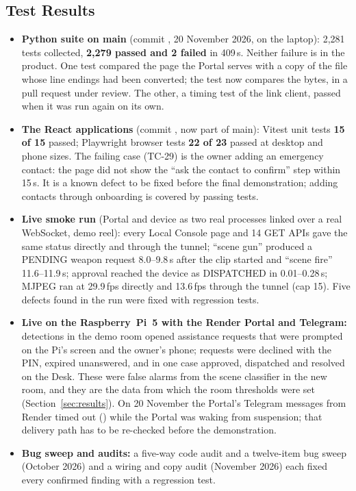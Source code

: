 \subsection{Test Results}
\label{sec:test-results}
\begin{itemize}
\item \textbf{Python suite on main} (commit , 20 November 2026, on the laptop): 2,281 tests collected, \textbf{2,279 passed and 2 failed} in 409\,s. Neither failure is in the product. One test compared the page the Portal serves with a copy of the file whose line endings had been converted; the test now compares the bytes, in a pull request under review. The other, a timing test of the link client, passed when it was run again on its own.
\item \textbf{The React applications} (commit , now part of main): Vitest unit tests \textbf{15 of 15} passed; Playwright browser tests \textbf{22 of 23} passed at desktop and phone sizes. The failing case (TC-29) is the owner adding an emergency contact: the page did not show the ``ask the contact to confirm'' step within 15\,s. It is a known defect to be fixed before the final demonstration; adding contacts through onboarding is covered by passing tests.
\item \textbf{Live smoke run} (Portal and device as two real processes linked over a real WebSocket, demo reel): every Local Console page and 14 GET APIs gave the same status directly and through the tunnel; ``scene gun'' produced a PENDING weapon request 8.0--9.8\,s after the clip started and ``scene fire'' 11.6--11.9\,s; approval reached the device as DISPATCHED in 0.01--0.28\,s; MJPEG ran at 29.9\,fps directly and 13.6\,fps through the tunnel (cap 15). Five defects found in the run were fixed with regression tests.
\item \textbf{Live on the Raspberry~Pi~5 with the Render Portal and Telegram:} detections in the demo room opened assistance requests that were prompted on the Pi's screen and the owner's phone; requests were declined with the PIN, expired unanswered, and in one case approved, dispatched and resolved on the Desk. These were false alarms from the scene classifier in the new room, and they are the data from which the room thresholds were set (Section~\ref{sec:results}). On 20 November the Portal's Telegram messages from Render timed out () while the Portal was waking from suspension; that delivery path has to be re-checked before the demonstration.
\item \textbf{Bug sweep and audits:} a five-way code audit and a twelve-item bug sweep (October 2026) and a wiring and copy audit (November 2026) each fixed every confirmed finding with a regression test.
\end{itemize}

